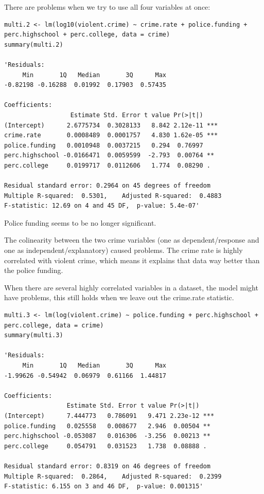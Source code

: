 \documentclass{article}
\begin{document}
There are problems when we try to use all four variables at once: 
\begin{lstlisting}
multi.2 <- lm(log10(violent.crime) ~ crime.rate + police.funding + perc.highschool + perc.college, data = crime)
summary(multi.2)

'Residuals:
     Min       1Q   Median       3Q      Max 
-0.82198 -0.16288  0.01992  0.17903  0.57435 

Coefficients:
                  Estimate Std. Error t value Pr(>|t|)    
(Intercept)      2.6775734  0.3028133   8.842 2.12e-11 ***
crime.rate       0.0008489  0.0001757   4.830 1.62e-05 ***
police.funding   0.0010948  0.0037215   0.294  0.76997    
perc.highschool -0.0166471  0.0059599  -2.793  0.00764 ** 
perc.college     0.0199717  0.0112606   1.774  0.08290 .  

Residual standard error: 0.2964 on 45 degrees of freedom
Multiple R-squared:  0.5301,	Adjusted R-squared:  0.4883 
F-statistic: 12.69 on 4 and 45 DF,  p-value: 5.4e-07'
\end{lstlisting}

Police funding seems to be no longer significant.\par 
The colinearity between the two crime variables (one as dependent/response and one as independent/explanatory) caused problems. The crime rate is highly correlated with violent crime, which means it explains that data way better than the police funding. \par
When there are several highly correlated variables in a dataset, the model might have problems, this still holds when we leave out the crime.rate statistic.

\begin{lstlisting}
multi.3 <- lm(log(violent.crime) ~ police.funding + perc.highschool + perc.college, data = crime)
summary(multi.3)

'Residuals:
     Min       1Q   Median       3Q      Max 
-1.99626 -0.54942  0.06979  0.61166  1.44817 

Coefficients:
                 Estimate Std. Error t value Pr(>|t|)    
(Intercept)      7.444773   0.786091   9.471 2.23e-12 ***
police.funding   0.025558   0.008677   2.946  0.00504 ** 
perc.highschool -0.053087   0.016306  -3.256  0.00213 ** 
perc.college     0.054791   0.031523   1.738  0.08888 .  

Residual standard error: 0.8319 on 46 degrees of freedom
Multiple R-squared:  0.2864,	Adjusted R-squared:  0.2399 
F-statistic: 6.155 on 3 and 46 DF,  p-value: 0.001315'
\end{lstlisting}
\end{document}
